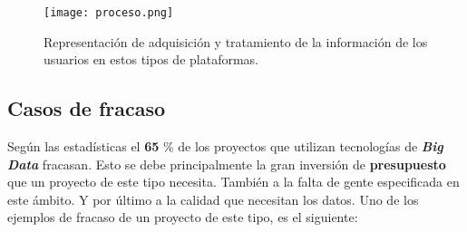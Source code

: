 \documentclass[11pt]{diazessay} %
\begin{document}
\begin{figure}[h!]
	\centering
	\texttt{[image: proceso.png]}
	\caption{Representación de adquisición y tratamiento de la información de los usuarios en estos tipos de plataformas.}
	\label{fig:proceso}
\end{figure}


\subsection*{Casos de fracaso}
Según las estadísticas el \textbf{65} \% de los proyectos que utilizan tecnologías de \textit{\textbf{Big Data}} fracasan. Esto se debe principalmente la gran inversión de \textbf{presupuesto} que un proyecto de este tipo necesita. También a la falta de gente especificada en este ámbito. Y por último a la calidad que necesitan los datos. Uno de los ejemplos de fracaso de un proyecto de este tipo, es el siguiente:\\
 










\clearpage




\end{document}
